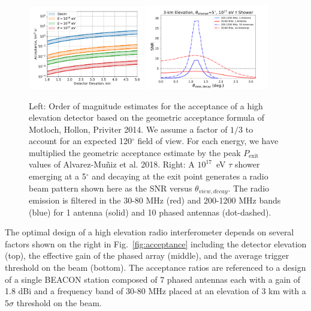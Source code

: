 \documentclass[12pt]{article}
\begin{document}
\begin{figure}[!h]
{\includegraphics[width=0.45\textwidth]{figures/Crude_Estimate.pdf}}
{\includegraphics[width=0.48\textwidth]{figures/SNR_example_emerge5deg_10antenna.pdf}}
\caption{Left: Order of magnitude estimates for the acceptance of a high elevation detector based on the geometric acceptance formula of Motloch, Hollon, Priviter 2014. We assume a factor of $1/3$ to account for an expected 120$^\circ$ field of view. For each energy, we have multiplied the geometric acceptance estimate by the peak $P_\mathrm{exit}$ values of Alvarez-Mu\~niz et al. 2018. Right: A $10^{17}$~eV $\tau$ shower emerging at a 5$^{\circ}$ and decaying at the exit point generates a radio beam pattern shown here as the SNR versus $\theta_{view,decay}$.  The radio emission is filtered in the 30-80 MHz (red) and 200-1200 MHz bands (blue) for 1 antenna (solid) and 10 phased antennas (dot-dashed).   }
\label{fig:crude_estimate}
\end{figure}



The optimal design of a high elevation radio interferometer depends on several factors shown on the right in Fig.~\ref{fig:acceptance} including the detector elevation (top), the effective gain of the phased array (middle), and the average trigger threshold on the beam (bottom). The acceptance ratios are referenced to a design of a single BEACON station composed of 7 phased antennas each with a gain of 1.8 dBi and a frequency band of 30-80 MHz placed at an elevation of 3 km with a 5$\sigma$ threshold on the beam.
\end{document}
